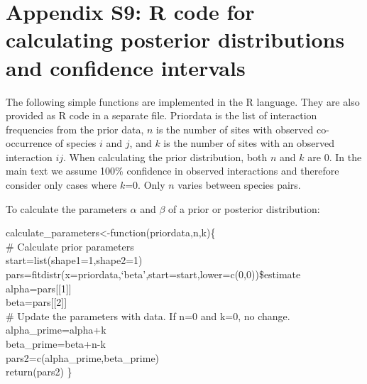 \documentclass[12pt]{article}
\begin{document}



\clearpage

\section*{Appendix S9: R code for calculating posterior distributions and confidence intervals}

  The following simple functions are implemented in the R language. They are 
  also provided as R code in a separate file.
  Priordata is the list of interaction frequencies from the prior 
  data, $n$ is the number of sites with observed co-occurrence of 
  species $i$ and $j$, and $k$ is the number of sites with an 
  observed interaction $ij$. When calculating the prior 
  distribution, both $n$ and $k$ are 0. In the main text we assume 100\%
  confidence in observed interactions and therefore consider only 
  cases where $k$=0. Only $n$ varies between species pairs.


  To calculate the parameters $\alpha$ and $\beta$ of a prior or 
  posterior distribution:

  \vspace{12pt}
  \begin{em}
  \noindent \hspace{2pt}calculate\_parameters\textless-function(priordata,n,k)\{\\
  \vspace{4pt}
    \# Calculate prior parameters\\
    start=list(shape1=1,shape2=1)\\
    pars=fitdistr(x=priordata,`beta',start=start,lower=c(0,0))\$estimate\\
    alpha=pars[[1]]\\
    beta=pars[[2]]\\
  \vspace{4pt}
    \# Update the parameters with data. If n=0 and k=0, no change.\\
    alpha\_prime=alpha+k\\
    beta\_prime=beta+n-k\\
    pars2=c(alpha\_prime,beta\_prime)\\
    return(pars2) \}
  \end{em}
  \vspace{12pt}
\end{document}
